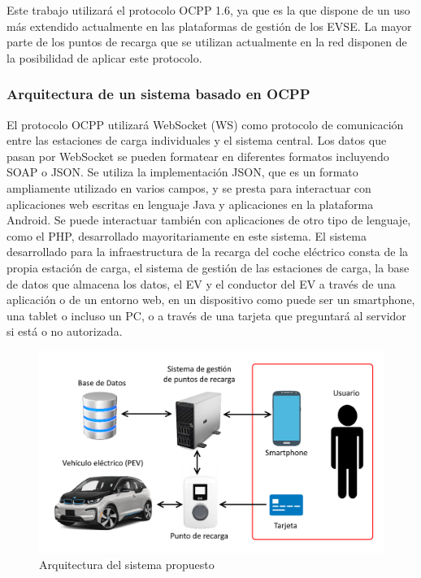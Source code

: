 \documentclass[12pt,a4paper,onecolumn,oneside]{report}
\begin{document}
Este trabajo utilizará el protocolo OCPP 1.6, ya que es la que dispone de un uso más extendido actualmente en las plataformas de gestión de los EVSE. La mayor parte de los puntos de recarga que se utilizan actualmente en la red disponen de la posibilidad de aplicar este protocolo.

\subsubsection{Arquitectura de un sistema basado en OCPP}
\label{Arquitectura de un sistema basado en OCPP}

El protocolo OCPP utilizará WebSocket (WS) como protocolo de comunicación entre las estaciones de carga individuales y el sistema central. Los datos que pasan por WebSocket se pueden formatear en diferentes formatos incluyendo SOAP o JSON. Se utiliza la implementación JSON, que es un formato ampliamente utilizado en varios campos, y se presta para interactuar con aplicaciones web escritas en lenguaje Java y aplicaciones en la plataforma Android. Se puede interactuar también con aplicaciones de otro tipo de lenguaje, como el PHP, desarrollado mayoritariamente en este sistema. El sistema desarrollado para la infraestructura de la recarga del coche eléctrico consta de la propia estación de carga, el sistema de gestión de las estaciones de carga, la base de datos que almacena los datos, el EV y el conductor del EV a través de una aplicación o de un entorno web, en un dispositivo como puede ser un smartphone, una tablet o incluso un PC, o a través de una tarjeta que preguntará al servidor si está o no autorizada.


\begin{figure}[H] 
\centering
  \includegraphics[width=.75\textwidth]{figuras/esquema.png}
  \caption[Arquitectura del sistema propuesto]{Arquitectura del sistema propuesto\\
  }
  \label{fig:arquitectura}
\end{figure}
\end{document}
